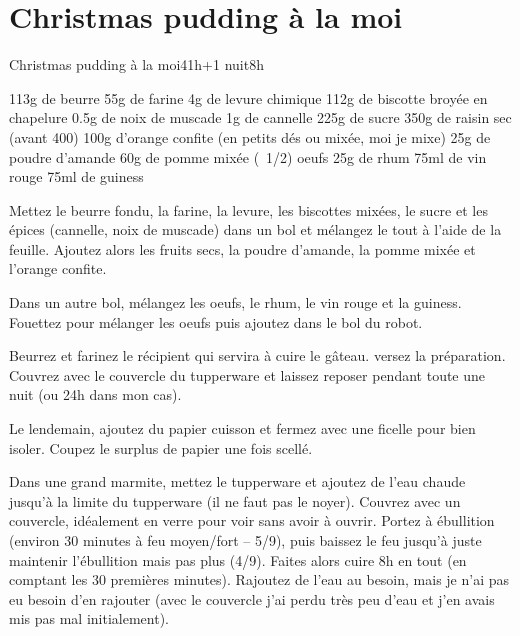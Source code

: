 {\section{Christmas pudding à la moi}
\begin{recette}{Christmas pudding à la moi}{4}{1h+1 nuit}{8h}
\begin{ingredients}[4 personnes]
\ingredient 113g de beurre
\ingredient 55g de farine
\ingredient 4g de levure chimique
\ingredient 112g de biscotte broyée en chapelure
\ingredient 0.5g de noix de muscade
\ingredient 1g de cannelle
\ingredient 225g de sucre
\ingredient 350g de raisin sec (avant 400)
\ingredient 100g d'orange confite (en petits dés ou mixée, moi je mixe)
\ingredient 25g de poudre d'amande
\ingredient 60g de pomme mixée (~1/2)
 oeufs
\ingredient 25g de rhum
\ingredient 75ml de vin rouge
\ingredient 75ml de guiness
\end{ingredients}

\begin{preparation}
\etape Mettez le beurre fondu, la farine, la levure, les biscottes mixées, le sucre et les épices (cannelle, noix de muscade) dans un bol et mélangez le tout à l'aide de la feuille. Ajoutez alors les fruits secs, la poudre d'amande, la pomme mixée et l'orange confite.

\etape Dans un autre bol, mélangez les oeufs, le rhum, le vin rouge et la guiness. Fouettez pour mélanger les oeufs puis ajoutez dans le bol du robot.

\etape Beurrez et farinez le récipient qui servira à cuire le gâteau. versez la préparation. Couvrez avec le couvercle du tupperware et laissez reposer pendant toute une nuit (ou 24h dans mon cas).
\end{preparation}

\begin{cuisson}
Le lendemain, ajoutez du papier cuisson et fermez avec une ficelle pour bien isoler. Coupez le surplus de papier une fois scellé.

Dans une grand marmite, mettez le tupperware et ajoutez de l'eau chaude jusqu'à la limite du tupperware (il ne faut pas le noyer). Couvrez avec un couvercle, idéalement en verre pour voir sans avoir à ouvrir. Portez à ébullition (environ 30 minutes à feu moyen/fort -- 5/9), puis baissez le feu jusqu'à juste maintenir l'ébullition mais pas plus (4/9). Faites alors cuire 8h en tout (en comptant les 30 premières minutes). Rajoutez de l'eau au besoin, mais je n'ai pas eu besoin d'en rajouter (avec le couvercle j'ai perdu très peu d'eau et j'en avais mis pas mal initialement).


\end{cuisson}
\end{recette}}
